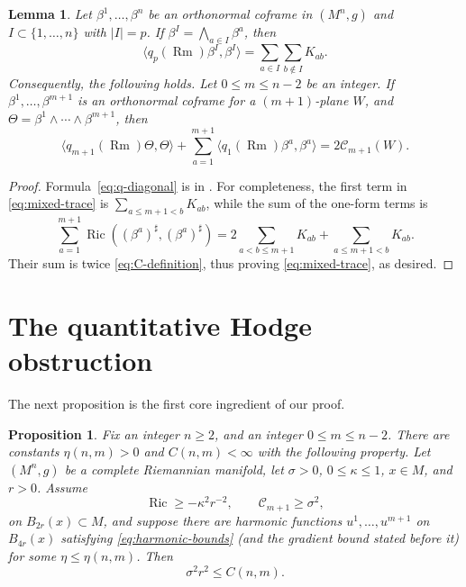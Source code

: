 \documentclass[11pt]{amsart}
\newtheorem{proposition}[theorem]{Proposition}
\newtheorem{lemma}[theorem]{Lemma}
\theoremstyle{definition}
\theoremstyle{remark}
\DeclareMathOperator{\Ric}{Ric}
\newcommand{\Rm}{\operatorname{Rm}}
\newcommand{\Cint}{\mathcal C}
\begin{document}
\begin{lemma}\label{lem:q-diagonal}
Let $\beta^1,\ldots,\beta^n$ be an orthonormal coframe in $(M^n,g)$ and
$I\subset\{1,\ldots,n\}$ with $|I|=p$.  If
$\beta^I=\bigwedge_{a\in I}\beta^a$, then
\begin{equation}\label{eq:q-diagonal}
 \big\langle q_p(\Rm)\beta^I,\beta^I\big\rangle
       =\sum_{a\in I}\sum_{b\notin I}K_{ab}.
\end{equation}
Consequently, the following holds. Let $0\leq m\leq n-2$ be an integer. If $\beta^1,\ldots,\beta^{m+1}$ is an
orthonormal coframe for a $(m+1)$-plane $W$, and
$\Theta=\beta^1\wedge\cdots\wedge\beta^{m+1}$, then
\begin{equation}\label{eq:mixed-trace}
 \big\langle q_{m+1}(\Rm)\Theta,\Theta\big\rangle
 +\sum_{a=1}^{m+1}
   \big\langle q_1(\Rm)\beta^a,\beta^a\big\rangle
       =2\Cint_{m+1}(W).
\end{equation}
\end{lemma}

\begin{proof}
Formula~\eqref{eq:q-diagonal} is in \cite[equation~(11)]{Labbi}.  For completeness, the first
term in \eqref{eq:mixed-trace} is
$\sum_{a\leq m+1<b}K_{ab}$, while the sum of the one-form terms is
\[
  \sum_{a=1}^{m+1}\Ric((\beta^a)^\sharp,(\beta^a)^\sharp)
  =2\sum_{a<b\leq m+1}K_{ab}+\sum_{a\leq m+1<b}K_{ab}.
\]
Their sum is twice \eqref{eq:C-definition}, thus proving \eqref{eq:mixed-trace}, as desired.
\end{proof}

\section{The quantitative Hodge obstruction}

The next proposition is the first core ingredient of our proof.

\begin{proposition}\label{prop:hodge-bound}
Fix an integer $n\geq2$, and an integer $0\leq m\leq n-2$.
There are constants $\eta(n,m)>0$ and $C(n,m)<\infty$ with the
following property. Let $(M^n,g)$ be a complete Riemannian manifold, let $\sigma> 0$, $0\leq \kappa\leq 1$, $x\in M$, and $r>0$. Assume
\[
                 \Ric\geq -\kappa^2r^{-2},
        \qquad   \mathcal{C}_{m+1}\geq\sigma^2,
\]
on $B_{2r}(x)\subset M$, and suppose there are harmonic functions
$u^1,\ldots,u^{m+1}$ on $B_{4r}(x)$ satisfying
\eqref{eq:harmonic-bounds} (and the gradient bound stated before it) for some
$\eta\leq\eta(n,m)$.  Then
\begin{equation}\label{eq:hodge-scale}
                         \sigma^2r^2\leq C(n,m).
\end{equation}
\end{proposition}
\end{document}
